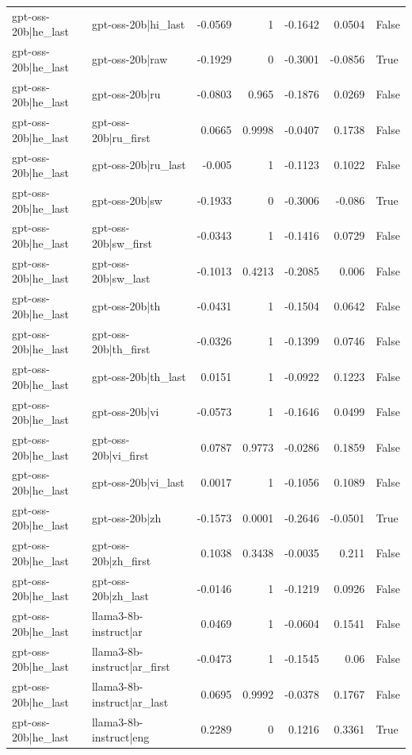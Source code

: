 \begin{table}
\begin{tabular}{l l r r r r l}
gpt-oss-20b|he_last & gpt-oss-20b|hi_last & -0.0569 & 1 & -0.1642 & 0.0504 & False \\
gpt-oss-20b|he_last & gpt-oss-20b|raw & -0.1929 & 0 & -0.3001 & -0.0856 & True \\
gpt-oss-20b|he_last & gpt-oss-20b|ru & -0.0803 & 0.965 & -0.1876 & 0.0269 & False \\
gpt-oss-20b|he_last & gpt-oss-20b|ru_first & 0.0665 & 0.9998 & -0.0407 & 0.1738 & False \\
gpt-oss-20b|he_last & gpt-oss-20b|ru_last & -0.005 & 1 & -0.1123 & 0.1022 & False \\
gpt-oss-20b|he_last & gpt-oss-20b|sw & -0.1933 & 0 & -0.3006 & -0.086 & True \\
gpt-oss-20b|he_last & gpt-oss-20b|sw_first & -0.0343 & 1 & -0.1416 & 0.0729 & False \\
gpt-oss-20b|he_last & gpt-oss-20b|sw_last & -0.1013 & 0.4213 & -0.2085 & 0.006 & False \\
gpt-oss-20b|he_last & gpt-oss-20b|th & -0.0431 & 1 & -0.1504 & 0.0642 & False \\
gpt-oss-20b|he_last & gpt-oss-20b|th_first & -0.0326 & 1 & -0.1399 & 0.0746 & False \\
gpt-oss-20b|he_last & gpt-oss-20b|th_last & 0.0151 & 1 & -0.0922 & 0.1223 & False \\
gpt-oss-20b|he_last & gpt-oss-20b|vi & -0.0573 & 1 & -0.1646 & 0.0499 & False \\
gpt-oss-20b|he_last & gpt-oss-20b|vi_first & 0.0787 & 0.9773 & -0.0286 & 0.1859 & False \\
gpt-oss-20b|he_last & gpt-oss-20b|vi_last & 0.0017 & 1 & -0.1056 & 0.1089 & False \\
gpt-oss-20b|he_last & gpt-oss-20b|zh & -0.1573 & 0.0001 & -0.2646 & -0.0501 & True \\
gpt-oss-20b|he_last & gpt-oss-20b|zh_first & 0.1038 & 0.3438 & -0.0035 & 0.211 & False \\
gpt-oss-20b|he_last & gpt-oss-20b|zh_last & -0.0146 & 1 & -0.1219 & 0.0926 & False \\
gpt-oss-20b|he_last & llama3-8b-instruct|ar & 0.0469 & 1 & -0.0604 & 0.1541 & False \\
gpt-oss-20b|he_last & llama3-8b-instruct|ar_first & -0.0473 & 1 & -0.1545 & 0.06 & False \\
gpt-oss-20b|he_last & llama3-8b-instruct|ar_last & 0.0695 & 0.9992 & -0.0378 & 0.1767 & False \\
gpt-oss-20b|he_last & llama3-8b-instruct|eng & 0.2289 & 0 & 0.1216 & 0.3361 & True \\

\end{tabular}
\end{table}
